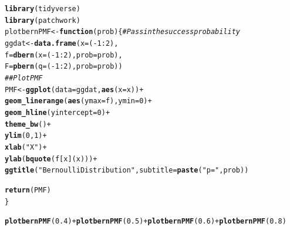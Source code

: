 \documentclass{article}\usepackage[]{graphicx}\usepackage[]{color}
\makeatletter
\newcommand{\hlnum}[1]{\textcolor[rgb]{0.686,0.059,0.569}{#1}}%
\newcommand{\hlstr}[1]{\textcolor[rgb]{0.192,0.494,0.8}{#1}}%
\newcommand{\hlcom}[1]{\textcolor[rgb]{0.678,0.584,0.686}{\textit{#1}}}%
\newcommand{\hlopt}[1]{\textcolor[rgb]{0,0,0}{#1}}%
\newcommand{\hlstd}[1]{\textcolor[rgb]{0.345,0.345,0.345}{#1}}%
\newcommand{\hlkwa}[1]{\textcolor[rgb]{0.161,0.373,0.58}{\textbf{#1}}}%
\newcommand{\hlkwb}[1]{\textcolor[rgb]{0.69,0.353,0.396}{#1}}%
\newcommand{\hlkwc}[1]{\textcolor[rgb]{0.333,0.667,0.333}{#1}}%
\newcommand{\hlkwd}[1]{\textcolor[rgb]{0.737,0.353,0.396}{\textbf{#1}}}%
\newenvironment{kframe}{%
 \def\at@end@of@kframe{}%
 \ifinner\ifhmode%
  \def\at@end@of@kframe{\end{minipage}}%
  \begin{minipage}{\columnwidth}%
 \fi\fi%
 \def\FrameCommand##1{\hskip\@totalleftmargin \hskip-\fboxsep
 \colorbox{shadecolor}{##1}\hskip-\fboxsep
     \hskip-\linewidth \hskip-\@totalleftmargin \hskip\columnwidth}%
 \MakeFramed {\advance\hsize-\width
   \@totalleftmargin\z@ \linewidth\hsize
   \@setminipage}}%
 {\par\unskip\endMakeFramed%
 \at@end@of@kframe}
\newenvironment{knitrout}{}{} %
\makeatother
\begin{document}
\begin{enumerate}
\begin{enumerate}
\begin{knitrout}
\color{fgcolor}\begin{kframe}
\begin{alltt}
\hlkwd{library}\hlstd{(tidyverse)}
\hlkwd{library}\hlstd{(patchwork)}
\hlstd{plotbernPMF} \hlkwb{<-} \hlkwa{function}\hlstd{(}\hlkwc{prob}\hlstd{)\{} \hlcom{# Pass in the success probability}
  \hlstd{ggdat} \hlkwb{<-} \hlkwd{data.frame}\hlstd{(}\hlkwc{x} \hlstd{= (}\hlopt{-}\hlnum{1}\hlopt{:}\hlnum{2}\hlstd{),}
                      \hlkwc{f} \hlstd{=} \hlkwd{dbern}\hlstd{(}\hlkwc{x} \hlstd{= (}\hlopt{-}\hlnum{1}\hlopt{:}\hlnum{2}\hlstd{),} \hlkwc{prob} \hlstd{= prob),}
                      \hlkwc{F} \hlstd{=} \hlkwd{pbern}\hlstd{(}\hlkwc{q} \hlstd{= (}\hlopt{-}\hlnum{1}\hlopt{:}\hlnum{2}\hlstd{),} \hlkwc{prob} \hlstd{= prob))}
  \hlcom{## Plot PMF}
  \hlstd{PMF} \hlkwb{<-} \hlkwd{ggplot}\hlstd{(}\hlkwc{data} \hlstd{= ggdat,} \hlkwd{aes}\hlstd{(}\hlkwc{x} \hlstd{= x))} \hlopt{+}
    \hlkwd{geom_linerange}\hlstd{(}\hlkwd{aes}\hlstd{(}\hlkwc{ymax} \hlstd{= f),} \hlkwc{ymin} \hlstd{=} \hlnum{0}\hlstd{)} \hlopt{+}
    \hlkwd{geom_hline}\hlstd{(}\hlkwc{yintercept} \hlstd{=} \hlnum{0}\hlstd{)} \hlopt{+}
    \hlkwd{theme_bw}\hlstd{()} \hlopt{+}
    \hlkwd{ylim}\hlstd{(}\hlnum{0}\hlstd{,} \hlnum{1}\hlstd{)} \hlopt{+}
    \hlkwd{xlab}\hlstd{(}\hlstr{"X"}\hlstd{)} \hlopt{+}
    \hlkwd{ylab}\hlstd{(}\hlkwd{bquote}\hlstd{(f[x](x)))} \hlopt{+}
    \hlkwd{ggtitle}\hlstd{(}\hlstr{"Bernoulli Distribution"}\hlstd{,}\hlkwc{subtitle} \hlstd{=} \hlkwd{paste}\hlstd{(}\hlstr{"p ="}\hlstd{, prob))}

  \hlkwd{return}\hlstd{(PMF)}
\hlstd{\}}

\hlkwd{plotbernPMF}\hlstd{(}\hlnum{0.4}\hlstd{)} \hlopt{+} \hlkwd{plotbernPMF}\hlstd{(}\hlnum{0.5}\hlstd{)} \hlopt{+} \hlkwd{plotbernPMF}\hlstd{(}\hlnum{0.6}\hlstd{)} \hlopt{+} \hlkwd{plotbernPMF}\hlstd{(}\hlnum{0.8}\hlstd{)}
\end{alltt}
\end{kframe}
\end{knitrout}


\end{enumerate}
\end{enumerate}
\end{document}
